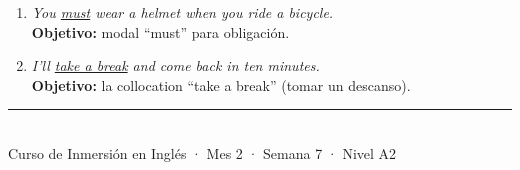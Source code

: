 \documentclass[12pt,a4paper]{article}
\begin{document}
\begin{cajamineria}
\begin{enumerate}[leftmargin=1.2cm]
  \item \textit{You \underline{must} wear a helmet when you ride a bicycle.}\\
    {\small\textbf{Objetivo:} modal ``must'' para obligación.}

  \item \textit{I'll \underline{take a break} and come back in ten minutes.}\\
    {\small\textbf{Objetivo:} la collocation ``take a break'' (tomar un descanso).}
\end{enumerate}
\end{cajamineria}

\vfill
\begin{center}
\rule{0.5\textwidth}{0.5pt}\\[0.3cm]
{\small\color{grissuave} Curso de Inmersión en Inglés · Mes 2 · Semana 7 · Nivel A2}
\end{center}
\end{document}
